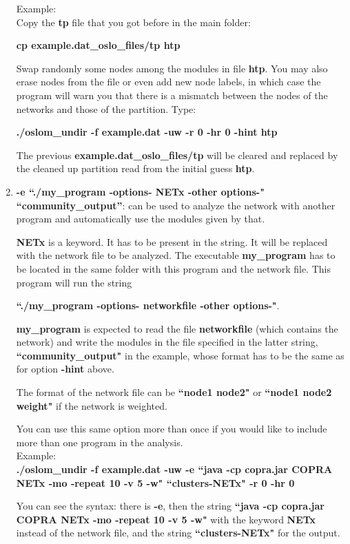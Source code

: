 \documentclass[11pt]{article}
\begin{document}
\begin{enumerate}
  Example:
  \\
  
  Copy the \textbf{tp} file that you got before in the main folder:
  
   \textbf{cp example.dat\_oslo\_files/tp htp}
  
  Swap randomly some nodes among the modules in file \textbf{htp}. You
  may also erase nodes from the file or even add new node labels, in
  which case the program will warn you that there is a mismatch
  between the nodes of the networks and those of the partition. Type:
  
{  \textbf{./oslom\_undir -f example.dat -uw -r 0 -hr 0 -hint htp} }
  
  The previous \textbf{example.dat\_oslo\_files/tp} will be cleared and replaced by the cleaned up partition read from the initial guess \textbf{htp}. 
  
  
    \item \textbf{-e ``./my\_program -options- NETx -other options-"  ``community\_output''}:  can be used to analyze the network with another program and automatically use the modules given by that.
    
\textbf{NETx} is a keyword. It has to be present in the string. It will be replaced with the network file to be analyzed.
The executable \textbf{my\_program} has to be located in the same folder with this program and the network file. This program will run the string 

\textbf{``./my\_program -options- networkfile  -other options-"}.

\textbf{my\_program} is expected to read the file \textbf{networkfile} (which contains the network)
 and write the modules in the file specified in the latter string, \textbf{``community\_output"} in the example, whose format has to be the same as for option \textbf{-hint} above.

The format of the network file can be \textbf{``node1 node2"} or \textbf{``node1 node2 weight"} if the network is weighted.

You can use this same option more than once if you would like to include more than one program in the analysis.
  \\
  
Example:
  \\
    
{  \textbf{  ./oslom\_undir -f example.dat -uw -e  ``java -cp copra.jar COPRA NETx -mo -repeat 10 -v 5 -w"  ``clusters-NETx" -r 0 -hr 0} }
  
  
You can see the syntax: there is \textbf{-e}, then the string \textbf{ ``java -cp copra.jar COPRA NETx -mo -repeat 10 -v 5 -w"} with the keyword \textbf{NETx} instead of the network file, and the string  \textbf{ ``clusters-NETx"} for the output.



\end{enumerate}
\end{document}
